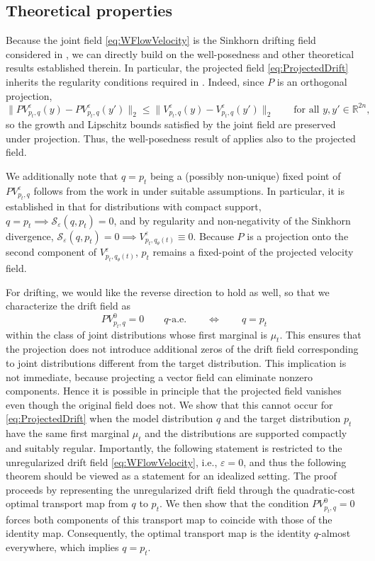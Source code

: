 \documentclass[oneside,11pt]{article}
\theoremstyle{remark}
\newcommand{\R}{\mathbb{R}}
\begin{document}
\subsection{Theoretical properties}
\label{sec:CDrift:Theory}
Because the joint field \eqref{eq:WFlowVelocity} is the Sinkhorn
    drifting field considered in \cite{han2026wflow}, we can directly build on
    the well-posedness and other theoretical results established therein.
    In particular, the projected field \eqref{eq:ProjectedDrift} inherits the
    regularity conditions required in 
    \cite{han2026wflow}. Indeed, since $P$ is an orthogonal projection,
    \[
        \|PV_{p_t,q}^{\varepsilon}(y) -PV_{p_t,q}^{\varepsilon}(y')\|_2 \leq \|V_{p_t,q}^{\varepsilon}(y)-V_{p_t,q}^{\varepsilon}(y')\|_2
        \qquad
        \text{for all }y,y'\in\R^{2n},
    \]
    so the growth and Lipschitz bounds satisfied by the joint field are
    preserved under projection. Thus, the well-posedness result of
    \cite{han2026wflow} applies also to the projected field.

We additionally note that $q=p_t$ being a (possibly non-unique) fixed point of $PV_{p_t,q}^{\varepsilon}$ follows from the work in \cite{han2026wflow,pmlr-v89-feydy19a} under suitable assumptions. In particular, it is established in \cite{pmlr-v89-feydy19a} that for distributions with compact support, $q=p_t \implies \mathcal{S}_{\varepsilon}(q,p_t) = 0$, and by regularity and non-negativity of the Sinkhorn divergence, $\mathcal{S}_{\varepsilon}(q,p_t) = 0 \implies V^{\varepsilon}_{p_t,q_{\theta}(t)} \equiv 0$. 
Because $P$ is a projection onto the second component of $V^{\varepsilon}_{p_t,q_{\theta}(t)}$,  $p_t$ remains a fixed-point of the projected velocity field.

For drifting, we would like the reverse direction to hold as well, so that we characterize the drift field as
    \[
       PV_{p_t,q}^{0}=0
    \qquad q\text{-a.e.}
    \qquad\Longleftrightarrow\qquad
    q=p_t
    \]
    within the class of joint distributions whose first marginal is $\mu_t$. This ensures that the projection does not introduce additional zeros of the drift field corresponding to joint distributions different from the target distribution.
This implication is not immediate, because projecting a vector field can eliminate nonzero components. Hence it is possible in principle that the projected field vanishes even though the original field does not. We show that this cannot occur for \eqref{eq:ProjectedDrift} when the model distribution $q$ and the target distribution $p_t$ have the same first marginal $\mu_t$ and the distributions are supported compactly and suitably regular. Importantly, the following statement is restricted to the unregularized drift field \eqref{eq:WFlowVelocity}, i.e., $\varepsilon=0$, and thus the following theorem should be viewed as a statement for an idealized setting. The proof proceeds by representing the unregularized drift field through the quadratic-cost optimal transport map from $q$ to $p_t$. We then show that the condition $PV_{p_t,q}^{0}=0$ forces both components of this transport map to coincide with those of the identity map. Consequently, the optimal transport map is the identity $q$-almost everywhere, which implies $q=p_t$.
\end{document}
